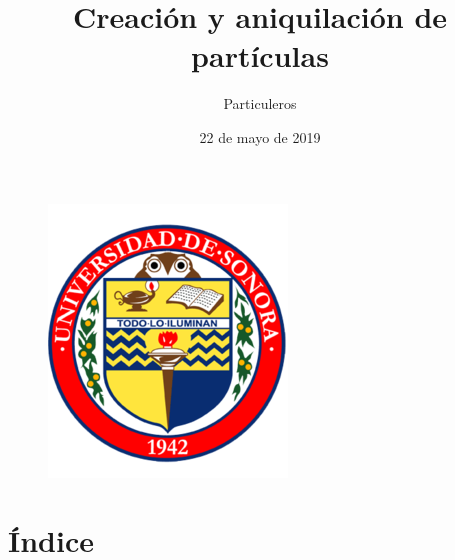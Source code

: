 \documentclass{beamer}
\title[Creación y aniquilaci\'on de part\'iculas]{Creaci\'on y aniquilaci\'on de part\'iculas}
\author{Particuleros}
\institute{\bf Universidad de Sonora}
\date{22 de mayo de 2019}
\begin{document}
\begin{frame}
\begin{figure}
    \centering
    \includegraphics[scale=.35]{logoo.png}
    
    
\end{figure}
  \titlepage
\end{frame}


\section{Índice}
\end{document}
